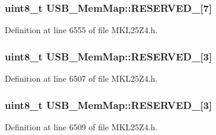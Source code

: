 \subsubsection[{\texorpdfstring{R\+E\+S\+E\+R\+V\+E\+D\+\_\+25}{RESERVED_25}}]{\setlength{\rightskip}{0pt plus 5cm}uint8\+\_\+t U\+S\+B\+\_\+\+Mem\+Map\+::\+R\+E\+S\+E\+R\+V\+E\+D\+\_\mbox{[}7\mbox{]}}\hypertarget{struct_u_s_b___mem_map_a2938cb654f5998a782bc2a59916ed6cc}{}\label{struct_u_s_b___mem_map_a2938cb654f5998a782bc2a59916ed6cc}


Definition at line 6555 of file M\+K\+L25\+Z4.\+h.

\subsubsection[{\texorpdfstring{R\+E\+S\+E\+R\+V\+E\+D\+\_\+3}{RESERVED_3}}]{\setlength{\rightskip}{0pt plus 5cm}uint8\+\_\+t U\+S\+B\+\_\+\+Mem\+Map\+::\+R\+E\+S\+E\+R\+V\+E\+D\+\_\mbox{[}3\mbox{]}}\hypertarget{struct_u_s_b___mem_map_abc1a41779b0653a09580c6dac4e39206}{}\label{struct_u_s_b___mem_map_abc1a41779b0653a09580c6dac4e39206}


Definition at line 6507 of file M\+K\+L25\+Z4.\+h.

\subsubsection[{\texorpdfstring{R\+E\+S\+E\+R\+V\+E\+D\+\_\+4}{RESERVED_4}}]{\setlength{\rightskip}{0pt plus 5cm}uint8\+\_\+t U\+S\+B\+\_\+\+Mem\+Map\+::\+R\+E\+S\+E\+R\+V\+E\+D\+\_\mbox{[}3\mbox{]}}\hypertarget{struct_u_s_b___mem_map_ac3f90a346f328a9959bedeb9af0c48eb}{}\label{struct_u_s_b___mem_map_ac3f90a346f328a9959bedeb9af0c48eb}


Definition at line 6509 of file M\+K\+L25\+Z4.\+h.

